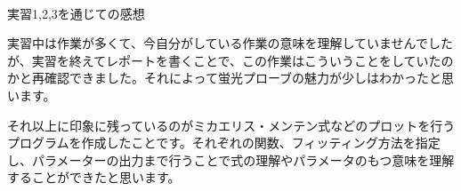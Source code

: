 \documentclass[a4paper,papersize,dvipdfmx]{jsarticle}
\begin{document}
\

\begin{tcolorbox}[colback=white,colbacktitle=black,coltitle=white,title={6.}]
 実習1,2,3を通じての感想
\end{tcolorbox}

実習中は作業が多くて、今自分がしている作業の意味を理解していませんでしたが、実習を終えてレポートを書くことで、この作業はこういうことをしていたのかと再確認できました。それによって蛍光プローブの魅力が少しはわかったと思います。

それ以上に印象に残っているのがミカエリス・メンテン式などのプロットを行うプログラムを作成したことです。それぞれの関数、フィッティング方法を指定し、パラメーターの出力まで行うことで式の理解やパラメータのもつ意味を理解することができたと思います。
\end{document}
